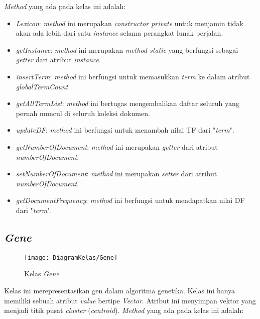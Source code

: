 \textit{Method} yang ada pada kelas ini adalah:

\begin{itemize}
	\item \textit{Lexicon}: \textit{method} ini merupakan \textit{constructor private} untuk menjamin tidak akan ada lebih dari satu \textit{instance} selama perangkat lunak berjalan.
	\item \textit{getInstance}: \textit{method} ini merupakan \textit{method static} yang berfungsi sebagai \textit{getter} dari atribut \textit{instance}.
	\item \textit{insertTerm}: \textit{method} ini berfungsi untuk memasukkan \textit{term} ke dalam atribut \textit{globalTermCount}.
	\item \textit{getAllTermList}: \textit{method} ini bertugas mengembalikan daftar seluruh \term yang pernah muncul di seluruh koleksi dokumen.
	\item \textit{updateDF}: \textit{method} ini berfungsi untuk menambah nilai TF dari \term "\textit{term}".
	\item \textit{getNumberOfDocument}: \textit{method} ini merupakan \textit{getter} dari atribut \textit{numberOfDocument}.
	\item \textit{setNumberOfDocument}: \textit{method} ini merupakan \textit{setter} dari atribut \textit{numberOfDocument}.
	\item \textit{getDocumentFrequency}: \textit{method} ini berfungsi untuk mendapatkan nilai DF dari \term "\textit{term}".
\end{itemize}

\subsection{\textit{Gene}}

\begin{figure}[H]
	\begin{center}
		\texttt{[image: DiagramKelas/Gene]}
		\caption{Kelas \textit{Gene}}
		\label{fig:kelasGene}
	\end{center}
\end{figure}

Kelas ini merepresentasikan gen dalam algoritma genetika. Kelas ini hanya memiliki sebuah atribut \textit{value} bertipe \textit{Vector}. Atribut ini menyimpan vektor yang menjadi titik pusat \textit{cluster} (\textit{centroid}). \textit{Method} yang ada pada kelas ini adalah:

